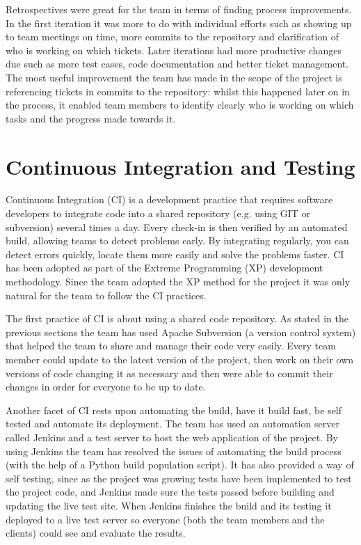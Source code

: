 \documentclass{l3proj}
\begin{document}
Retrospectives were great for the team in terms of finding process improvements. In the first iteration it was more to
do with individual efforts such as showing up to team meetings on time, more commits to the repository and clarification
of who is working on which tickets. Later iterations had more productive changes due such as more test cases, code
documentation and better ticket management. The most useful improvement the team has made in the scope of the project
is referencing tickets in commits to the repository: whilst this happened later on in the process, it enabled team members
to identify clearly who is working on which tasks and the progress made towards it.


\section{Continuous Integration and Testing}
\label{sec:continuous-integration}

Continuous Integration (CI) is a development practice that requires software developers to integrate code into a shared
repository (e.g. using GIT or subversion) several times a day. Every check-in is then verified by an automated build,
allowing teams to detect problems early. By integrating regularly, you can detect errors quickly, locate them more easily
and solve the problems faster. CI has been adopted as part of the Extreme Programming (XP) development methodology.
Since the team adopted the XP method for the project it was only natural for the team to follow the CI practices.

The first practice of CI is about using a shared code repository. As stated in the previous sections the team has
used Apache Subversion (a version control system) that helped the team to share and manage their code very easily. Every team
member could update to the latest version of the project, then work on their own versions of code changing it as
necessary and then were able to commit their changes in order for everyone to be up to date.

Another facet of CI rests upon automating the build, have it build fast, be self tested and automate its
deployment. The team has used an automation server called Jenkins and a test server to host the web application of the
project. By using Jenkins the team has resolved the issues of automating the build process (with the help of a Python build
population script). It has also provided a way of self testing, since as the project was growing tests have been
implemented to test the project code, and Jenkins made sure the tests passed before building and updating the live test site.
When Jenkins finishes the build and its testing it deployed to a live test server so everyone (both the team members and
the clients) could see and evaluate the results.
\end{document}
